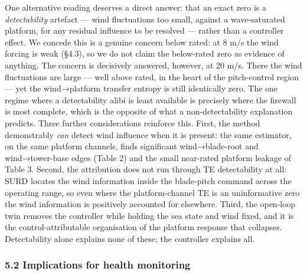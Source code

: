 \documentclass[
  english,
  11pt,
]{article}
\begin{document}
One alternative reading deserves a direct answer: that an exact zero is
a \emph{detectability} artefact --- wind fluctuations too small, against
a wave-saturated platform, for any residual influence to be resolved ---
rather than a controller effect. We concede this is a genuine concern
below rated: at 8 m/s the wind forcing is weak (§4.3), so we do not
claim the below-rated zero as evidence of anything. The concern is
decisively answered, however, at 20 m/s. There the wind fluctuations are
large --- well above rated, in the heart of the pitch-control region ---
yet the wind→platform transfer entropy is still identically zero. The
one regime where a detectability alibi is least available is precisely
where the firewall is most complete, which is the opposite of what a
non-detectability explanation predicts. Three further considerations
reinforce this. First, the method demonstrably \emph{can} detect wind
influence when it is present: the same estimator, on the same platform
channels, finds significant wind→blade-root and wind→tower-base edges
(Table 2) and the small near-rated platform leakage of Table 3. Second,
the attribution does not run through TE detectability at all: SURD
locates the wind information inside the blade-pitch command across the
operating range, so even where the platform-channel TE is an
uninformative zero the wind information is positively accounted for
elsewhere. Third, the open-loop twin removes the controller while
holding the sea state and wind fixed, and it is the control-attributable
organisation of the platform response that collapses. Detectability
alone explains none of these; the controller explains all.

\subsubsection{5.2 Implications for health
monitoring}\label{implications-for-health-monitoring}
\end{document}

